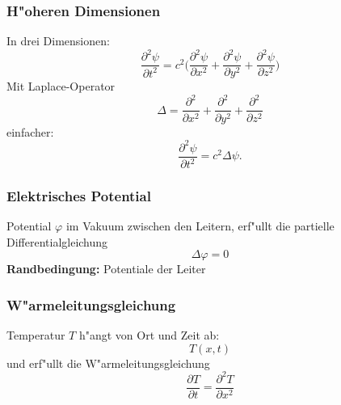 \documentclass{beamer}
\begin{document}
\begin{frame}
\frametitle{H"oheren Dimensionen}
In drei Dimensionen:
\[
\frac{\partial^2\psi}{\partial t^2}=c^2
\biggl(
\frac{\partial^2\psi}{\partial x^2}
+
\frac{\partial^2\psi}{\partial y^2}
+
\frac{\partial^2\psi}{\partial z^2}
\biggr)
\]
\pause
Mit Laplace-Operator
\[
\Delta
=
\frac{\partial^2}{\partial x^2}
+
\frac{\partial^2}{\partial y^2}
+
\frac{\partial^2}{\partial z^2}
\]
\pause
einfacher:
\[
\frac{\partial^2\psi}{\partial t^2}
=
c^2\Delta \psi.
\]
\end{frame}


\begin{frame}
\frametitle{Elektrisches Potential}
Potential 
$\varphi$ 
im Vakuum zwischen den Leitern,
\pause
erf"ullt die partielle Differentialgleichung
\[
\Delta \varphi =0
\]
\pause
{\bf Randbedingung:} Potentiale der Leiter
\end{frame}

\begin{frame}
\frametitle{W"armeleitungsgleichung}
Temperatur $T$ h"angt von Ort und Zeit ab:
\[
T(x,t)
\]
\pause
und erf"ullt die W"armeleitungsgleichung
\[
\frac{\partial T}{\partial t}=\frac{\partial^2T}{\partial x^2}
\]

\end{frame}
\end{document}
